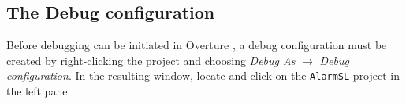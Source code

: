 \subsection{The Debug configuration}\label{sec:debugconfig}
Before debugging can be initiated in Overture
, a debug configuration must be created by right-clicking the project and choosing \emph{Debug As} $ \rightarrow $ \emph{Debug configuration}.  In the resulting window, locate and click on the \texttt{AlarmSL} project in the left pane.

